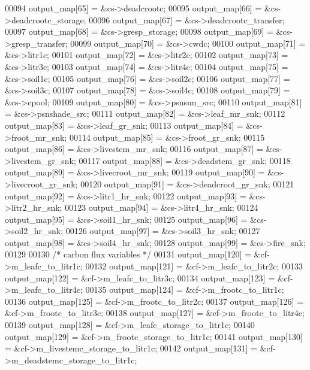 \begin{DoxyCode}
00094         output\_map[65] = &cs->deadcrootc;
00095         output\_map[66] = &cs->deadcrootc\_storage;
00096         output\_map[67] = &cs->deadcrootc\_transfer;
00097         output\_map[68] = &cs->gresp\_storage;
00098         output\_map[69] = &cs->gresp\_transfer;
00099         output\_map[70] = &cs->cwdc;
00100         output\_map[71] = &cs->litr1c;
00101         output\_map[72] = &cs->litr2c;
00102         output\_map[73] = &cs->litr3c;
00103         output\_map[74] = &cs->litr4c;
00104         output\_map[75] = &cs->soil1c;
00105         output\_map[76] = &cs->soil2c;
00106         output\_map[77] = &cs->soil3c;
00107         output\_map[78] = &cs->soil4c;
00108         output\_map[79] = &cs->cpool;
00109         output\_map[80] = &cs->psnsun\_src;
00110         output\_map[81] = &cs->psnshade\_src;
00111         output\_map[82] = &cs->leaf\_mr\_snk;
00112         output\_map[83] = &cs->leaf\_gr\_snk;
00113         output\_map[84] = &cs->froot\_mr\_snk;
00114         output\_map[85] = &cs->froot\_gr\_snk;
00115         output\_map[86] = &cs->livestem\_mr\_snk;
00116         output\_map[87] = &cs->livestem\_gr\_snk;
00117         output\_map[88] = &cs->deadstem\_gr\_snk;
00118         output\_map[89] = &cs->livecroot\_mr\_snk;
00119         output\_map[90] = &cs->livecroot\_gr\_snk;
00120         output\_map[91] = &cs->deadcroot\_gr\_snk;
00121         output\_map[92] = &cs->litr1\_hr\_snk;
00122         output\_map[93] = &cs->litr2\_hr\_snk;
00123         output\_map[94] = &cs->litr4\_hr\_snk;
00124         output\_map[95] = &cs->soil1\_hr\_snk;
00125         output\_map[96] = &cs->soil2\_hr\_snk;
00126         output\_map[97] = &cs->soil3\_hr\_snk;
00127         output\_map[98] = &cs->soil4\_hr\_snk;
00128         output\_map[99] = &cs->fire\_snk;
00129         
00130         \textcolor{comment}{/* carbon flux variables */}
00131         output\_map[120] = &cf->m\_leafc\_to\_litr1c;
00132         output\_map[121] = &cf->m\_leafc\_to\_litr2c;
00133         output\_map[122] = &cf->m\_leafc\_to\_litr3c;
00134         output\_map[123] = &cf->m\_leafc\_to\_litr4c;
00135         output\_map[124] = &cf->m\_frootc\_to\_litr1c;
00136         output\_map[125] = &cf->m\_frootc\_to\_litr2c;
00137         output\_map[126] = &cf->m\_frootc\_to\_litr3c;
00138         output\_map[127] = &cf->m\_frootc\_to\_litr4c;
00139         output\_map[128] = &cf->m\_leafc\_storage\_to\_litr1c;
00140         output\_map[129] = &cf->m\_frootc\_storage\_to\_litr1c;
00141         output\_map[130] = &cf->m\_livestemc\_storage\_to\_litr1c;
00142         output\_map[131] = &cf->m\_deadstemc\_storage\_to\_litr1c;

\end{DoxyCode}
